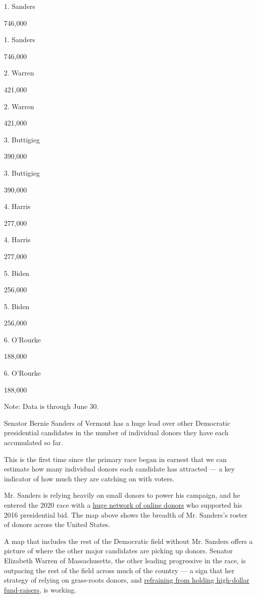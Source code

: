1. Sanders

746,000

1. Sanders

746,000

2. Warren

421,000

2. Warren

421,000

3. Buttigieg

390,000

3. Buttigieg

390,000

4. Harris

277,000

4. Harris

277,000

5. Biden

256,000

5. Biden

256,000

6. O'Rourke

188,000

6. O'Rourke

188,000

Note: Data is through June 30.

Senator Bernie Sanders of Vermont has a huge lead over other Democratic
presidential candidates in the number of individual donors they have
each accumulated so far.

This is the first time since the primary race began in earnest that we
can estimate how many individual donors each candidate has attracted ---
a key indicator of how much they are catching on with voters.

Mr. Sanders is relying heavily on small donors to power his campaign,
and he entered the 2020 race with a
\href{https://www.nytimes.com/2019/02/09/us/politics/2020-democrats-campaign-funding.html}{huge
network of online donors} who supported his 2016 presidential bid. The
map above shows the breadth of Mr. Sanders's roster of donors across the
United States.

A map that includes the rest of the Democratic field without Mr. Sanders
offers a picture of where the other major candidates are picking up
donors. Senator Elizabeth Warren of Massachusetts, the other leading
progressive in the race, is outpacing the rest of the field across much
of the country --- a sign that her strategy of relying on grass-roots
donors, and
\href{https://www.nytimes.com/2019/02/25/us/politics/elizabeth-warren-donors-fundraising.html?module=inline}{refraining
from holding high-dollar fund-raisers}, is working.

